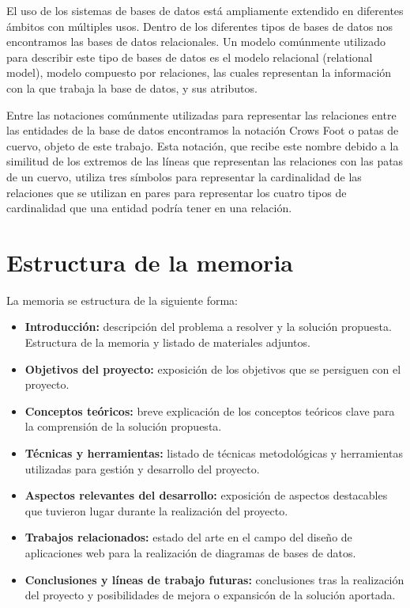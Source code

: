 
El uso de los sistemas de bases de datos está ampliamente extendido en diferentes ámbitos con múltiples usos. Dentro de los diferentes tipos de bases de datos nos encontramos las bases de datos relacionales\cite{wiki:relational_db}. Un modelo comúnmente utilizado para describir este tipo de bases de datos es el modelo relacional (relational model)\cite{wiki:relational_model}, modelo compuesto por relaciones, las cuales representan la información con la que trabaja la base de datos, y sus atributos.

Entre las notaciones comúnmente utilizadas para representar las relaciones entre las entidades de la base de datos encontramos la notación Crows Foot o patas de cuervo, objeto de este trabajo. Esta notación, que recibe este nombre debido a la similitud de los extremos de las líneas que representan las relaciones con las patas de un cuervo, utiliza tres símbolos para representar la cardinalidad de las relaciones que se utilizan en pares para representar los cuatro tipos de cardinalidad que una entidad podría tener en una relación.

\section{Estructura de la memoria}
La memoria se estructura de la siguiente forma:
\begin{itemize}
    \item \textbf{Introducción: } descripción del problema a resolver y la solución propuesta. Estructura de la memoria y listado de materiales adjuntos.
    \item \textbf{Objetivos del proyecto: } exposición de los objetivos que se persiguen con el proyecto.
    \item \textbf{Conceptos teóricos: }breve explicación de los conceptos teóricos clave para la comprensión de la solución propuesta.
    \item \textbf{Técnicas y herramientas: }listado de técnicas metodológicas y herramientas utilizadas para gestión y desarrollo del proyecto.
    \item \textbf{Aspectos relevantes del desarrollo: }exposición de aspectos destacables que tuvieron lugar durante la realización del proyecto.
    \item \textbf{Trabajos relacionados: }estado del arte en el campo del diseño de aplicaciones web para la realización de diagramas de bases de datos.
    \item \textbf{Conclusiones y líneas de trabajo futuras: }conclusiones tras la realización del proyecto y posibilidades de mejora o expansicón de la solución aportada.
\end{itemize}

